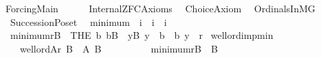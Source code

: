 %
\begin{isabellebody}%
%
%
\isadelimdocument
%
\endisadelimdocument
%
\isatagdocument
%
\isamarkuptrue%
%
\endisatagdocument
{\isafolddocument}%
%
\isadelimdocument
%
\endisadelimdocument
%
\isadelimtheory
%
\endisadelimtheory
%
\isatagtheory
{}\isamarkupfalse%
\ Forcing{\isacharunderscore}{\kern0pt}Main\isanewline
\ \ \ \isanewline
\ \ Internal{\isacharunderscore}{\kern0pt}ZFC{\isacharunderscore}{\kern0pt}Axioms\isanewline
\ \ Choice{\isacharunderscore}{\kern0pt}Axiom\isanewline
\ \ Ordinals{\isacharunderscore}{\kern0pt}In{\isacharunderscore}{\kern0pt}MG\isanewline
\ \ Succession{\isacharunderscore}{\kern0pt}Poset\isanewline
\isanewline
{}%
\endisatagtheory
{\isafoldtheory}%
%
\isadelimtheory
%
\endisadelimtheory
%
\isadelimdocument
%
\endisadelimdocument
%
\isatagdocument
%
\isamarkuptrue%
%
\endisatagdocument
{\isafolddocument}%
%
\isadelimdocument
%
\endisadelimdocument
{}\isamarkupfalse%
\isanewline
\ \ minimum\ {\isacharcolon}{\kern0pt}{\isacharcolon}{\kern0pt}\ {\isachardoublequoteopen}i\ {\isasymRightarrow}\ i\ {\isasymRightarrow}\ i{\isachardoublequoteclose}\ \isanewline
\ \ {\isachardoublequoteopen}minimum{\isacharparenleft}{\kern0pt}r{\isacharcomma}{\kern0pt}B{\isacharparenright}{\kern0pt}\ {\isasymequiv}\ THE\ b{\isachardot}{\kern0pt}\ b{\isasymin}B\ {\isasymand}\ {\isacharparenleft}{\kern0pt}{\isasymforall}y{\isasymin}B{\isachardot}{\kern0pt}\ y\ {\isasymnoteq}\ b\ {\isasymlongrightarrow}\ {\isasymlangle}b{\isacharcomma}{\kern0pt}\ y{\isasymrangle}\ {\isasymin}\ r{\isacharparenright}{\kern0pt}{\isachardoublequoteclose}\isanewline
\isanewline
{}\isamarkupfalse%
\ well{\isacharunderscore}{\kern0pt}ord{\isacharunderscore}{\kern0pt}imp{\isacharunderscore}{\kern0pt}min{\isacharcolon}{\kern0pt}\isanewline
\ \ \ \isanewline
\ \ \ \ {\isachardoublequoteopen}well{\isacharunderscore}{\kern0pt}ord{\isacharparenleft}{\kern0pt}A{\isacharcomma}{\kern0pt}r{\isacharparenright}{\kern0pt}{\isachardoublequoteclose}\ {\isachardoublequoteopen}B\ {\isasymsubseteq}\ A{\isachardoublequoteclose}\ {\isachardoublequoteopen}B\ {\isasymnoteq}\ {}{\isachardoublequoteclose}\isanewline
\ \ \ \isanewline
\ \ \ \ {\isachardoublequoteopen}minimum{\isacharparenleft}{\kern0pt}r{\isacharcomma}{\kern0pt}B{\isacharparenright}{\kern0pt}\ {\isasymin}\ B{\isachardoublequoteclose}\ \isanewline

\end{isabellebody}
